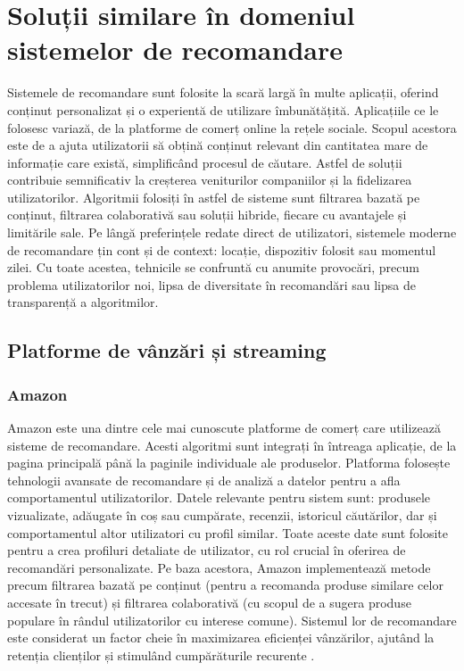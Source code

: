 \chapter{Soluții similare în domeniul sistemelor de recomandare}
\label{chap:ch2}

Sistemele de recomandare sunt folosite la scară largă în multe aplicații, oferind conținut personalizat și o experientă de utilizare îmbunătățită. 
Aplicațiile ce le folosesc variază, de la platforme de comerț online la rețele sociale.
Scopul acestora este de a ajuta utilizatorii să obțină conținut relevant din cantitatea mare de informație care există, simplificând procesul de căutare.
Astfel de soluții contribuie semnificativ la creșterea veniturilor companiilor și la fidelizarea utilizatorilor.
Algoritmii folosiți în astfel de sisteme sunt filtrarea bazată pe conținut, filtrarea colaborativă sau soluții hibride, fiecare cu avantajele și limitările sale.
Pe lângă preferințele redate direct de utilizatori, sistemele moderne de recomandare țin cont și de context: locație, dispozitiv folosit sau momentul zilei.
Cu toate acestea, tehnicile se confruntă cu anumite provocări, precum problema utilizatorilor noi, lipsa de diversitate în recomandări sau lipsa de transparență a algoritmilor.

\section{Platforme de vânzări și streaming}
\label{sec:ch2sec1}
\subsection*{Amazon}
Amazon este una dintre cele mai cunoscute platforme de comerț care utilizează sisteme de recomandare.
Acesti algoritmi sunt integrați în întreaga aplicație, de la pagina principală până la paginile individuale ale produselor.
Platforma folosește tehnologii avansate de recomandare și de analiză a datelor pentru a afla comportamentul utilizatorilor.
Datele relevante pentru sistem sunt: produsele vizualizate, adăugate în coș sau cumpărate, recenzii, istoricul căutărilor, dar și comportamentul altor utilizatori cu profil similar. 
Toate aceste date sunt folosite pentru a crea profiluri detaliate de utilizator, cu rol crucial în oferirea de recomandări personalizate.
Pe baza acestora, Amazon implementează metode precum filtrarea bazată pe conținut (pentru a recomanda produse similare celor accesate în trecut) și filtrarea colaborativă (cu scopul de a sugera produse populare în rândul utilizatorilor cu interese comune).
Sistemul lor de recomandare este considerat un factor cheie în maximizarea eficienței vânzărilor, ajutând la retenția clienților și stimulând cumpărăturile recurente \cite{ahmed2022amazon, smith2017two}.

